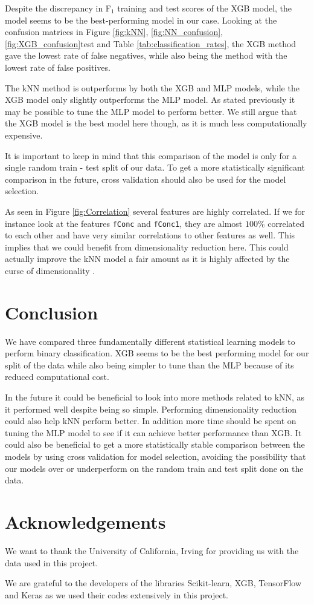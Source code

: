 \documentclass[a4paper, 11pt, twocolumn]{article}
\begin{document}
Despite the discrepancy in F$_1$ training and test scores of the XGB model, the 
model seems to be the best-performing model in our case. Looking at the 
confusion matrices in Figure \ref{fig:kNN}, \ref{fig:NN_confusion}, 
\ref{fig:XGB_confusion}test and Table \ref{tab:classification_rates}, the XGB 
method gave the lowest rate of false negatives, while also 
being the method with the lowest rate of false positives. 

The kNN method is outperforms by both the XGB and MLP models, while the XGB 
model only slightly outperforms the MLP model. As stated previously it may be 
possible to tune the MLP model to perform better. We still argue that the XGB
model is the best model here though, as it is much less computationally expensive.


It is important to keep in mind that this comparison of the model is only for a 
single random train - test split of our data. To get a more statistically 
significant comparison in the future, cross validation should also be used for 
the model selection.

As seen in Figure \ref{fig:Correlation} several features are highly correlated.
If we for instance look at the features \texttt{fConc} and \texttt{fConc1}, 
they are almost $100\%$ correlated to each other and have very similar correlations 
to other features as well. This implies that we could benefit from dimensionality 
reduction here. This could actually improve the kNN model a fair amount as it is 
highly affected by the curse of dimensionality \cite{hastie}.

\section{Conclusion}
We have compared three fundamentally different statistical learning models to 
perform binary classification. XGB seems to be the best performing model for 
our split of the data while also being simpler to tune than the MLP because of 
its reduced computational cost.

In the future it could be beneficial to look into more methods related to kNN, as
it performed well despite being so simple. Performing dimensionality reduction 
could also help kNN perform better.
In addition more time should be spent on tuning the MLP model to see if it can
achieve better performance than XGB. It could also be beneficial to get a 
more statistically stable comparison between the models by using cross validation 
for model selection, avoiding the possibility that our models over or underperform 
on the random train and test split done on the data.

\section*{Acknowledgements}
We want to thank the University of California, Irving for providing us with the
data used in this project.

We are grateful to the developers of the libraries Scikit-learn, XGB, TensorFlow 
and Keras as we used their codes extensively in this project.


%

\end{document}

